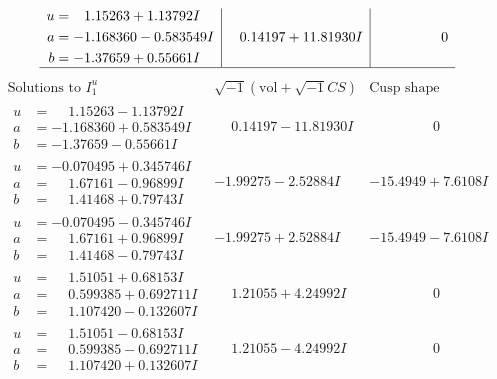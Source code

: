 \documentclass[1p]{elsarticle_modified}
\theoremstyle{definition}
\newcommand{\I}{\sqrt{-1}}
\begin{document}
$$\begin{array}{c|c|c}
\begin{aligned}
u &= \phantom{-}1.15263 + 1.13792 I \\
a &= -1.168360 - 0.583549 I \\
b &= -1.37659 + 0.55661 I\end{aligned}
 & \phantom{-}0.14197 + 11.81930 I & \phantom{-0.000000 } 0\\
 \hline 
 \end{array}$$\newpage$$\begin{array}{c|c|c}  
\text{Solutions to }I^u_{1}& \I (\text{vol} + \sqrt{-1}CS) & \text{Cusp shape}\\
 \hline 
\begin{aligned}
u &= \phantom{-}1.15263 - 1.13792 I \\
a &= -1.168360 + 0.583549 I \\
b &= -1.37659 - 0.55661 I\end{aligned}
 & \phantom{-}0.14197 - 11.81930 I & \phantom{-0.000000 } 0 \\ \hline\begin{aligned}
u &= -0.070495 + 0.345746 I \\
a &= \phantom{-}1.67161 - 0.96899 I \\
b &= \phantom{-}1.41468 + 0.79743 I\end{aligned}
 & -1.99275 - 2.52884 I & -15.4949 + 7.6108 I \\ \hline\begin{aligned}
u &= -0.070495 - 0.345746 I \\
a &= \phantom{-}1.67161 + 0.96899 I \\
b &= \phantom{-}1.41468 - 0.79743 I\end{aligned}
 & -1.99275 + 2.52884 I & -15.4949 - 7.6108 I \\ \hline\begin{aligned}
u &= \phantom{-}1.51051 + 0.68153 I \\
a &= \phantom{-}0.599385 + 0.692711 I \\
b &= \phantom{-}1.107420 - 0.132607 I\end{aligned}
 & \phantom{-}1.21055 + 4.24992 I & \phantom{-0.000000 } 0 \\ \hline\begin{aligned}
u &= \phantom{-}1.51051 - 0.68153 I \\
a &= \phantom{-}0.599385 - 0.692711 I \\
b &= \phantom{-}1.107420 + 0.132607 I\end{aligned}
 & \phantom{-}1.21055 - 4.24992 I & \phantom{-0.000000 } 0 \\ \hline\begin{aligned}

\end{aligned}
\end{array}$$
\end{document}
